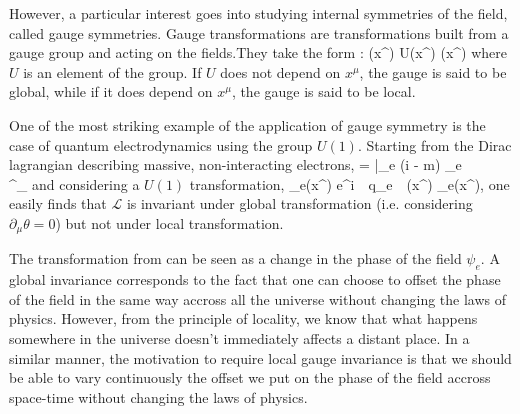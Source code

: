     However, a particular interest goes into studying internal symmetries of the field,
    called gauge symmetries. Gauge transformations are transformations built from a gauge
    group and acting on the fields.They take the form :
    {
        \psi(x^\mu)
        \rightarrow
        U(x^\mu) \psi(x^\mu)
    }
    where $U$ is an element of the group. If $U$ does not depend on $x^\mu$, the gauge is
    said to be global, while if it does depend on $x^\mu$, the gauge is said to be local.

    One of the most striking example of the application of gauge symmetry is the case of
    quantum electrodynamics using the group $U(1)$. Starting from the Dirac lagrangian
    describing massive, non-interacting electrons,
    {
        =
        \bar{\psi_e} (i \dslash - m) \psi_e
        \,\,\,\,\,\,\,
        \,\,\,\,\,\,\,
        \dslash {} \gamma^\mu \partial_\mu
    }
    and considering a $U(1)$ transformation,
    {
        \psi_e(x^\mu)
        \rightarrow
        e^{i \,\cdot\, q_e \,\cdot\, \theta(x^\mu)} \psi_e(x^\mu),
    }
    one easily finds that $\mathcal{L}$ is invariant under global transformation (i.e.
    considering $\partial_\mu \theta = 0$) but not under local transformation.

    The transformation from  can be seen as a change in the phase of the field
    $\psi_e$. A global invariance corresponds to the fact that one can choose to offset
    the phase of the field in the same way accross all the universe without changing the
    laws of physics. However, from the principle of locality, we know that what happens
    somewhere in the universe doesn't immediately affects a distant place. In a similar
    manner, the motivation to require local gauge invariance is that we should be able to
    vary continuously the offset we put on the phase of the field accross space-time
    without changing the laws of physics.

